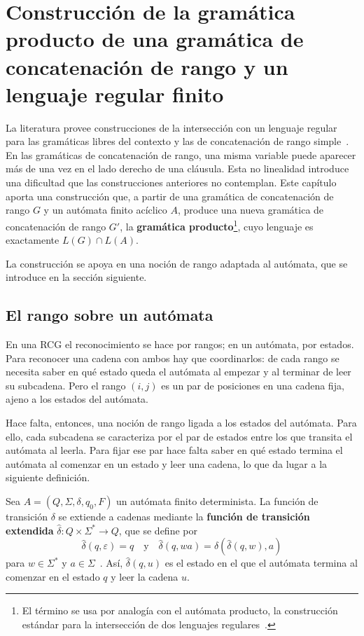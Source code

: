 
\chapter{Construcción de la gramática producto de una gramática de concatenación de rango y un lenguaje regular finito}
\label{cap:interseccion}

La literatura provee construcciones de la intersección con un lenguaje
regular para las gramáticas libres del contexto y las de
concatenación de rango simple~\cite{barhillel1961, bertsch2001rcg}. En las gramáticas
de concatenación de rango, una misma variable puede aparecer más de una
vez en el lado derecho de una cláusula. Esta no linealidad introduce una
dificultad que las construcciones anteriores no contemplan. Este capítulo aporta una
construcción que, a partir de una gramática de concatenación de rango
$G$ y un autómata finito acíclico $A$, produce una nueva gramática de
concatenación de rango $G'$, la \textbf{gramática
producto}\footnote{El término se usa por analogía con el autómata
producto, la construcción estándar para la intersección de dos
lenguajes regulares~\cite{hopcroft2006introduction}.},
cuyo lenguaje es exactamente $L(G) \cap L(A)$.

La construcción se apoya en una noción de rango adaptada al autómata,
que se introduce en la sección siguiente.

\section{El rango sobre un autómata}

En una RCG el reconocimiento se hace por rangos; en un autómata, por
estados. Para reconocer una cadena con ambos hay que coordinarlos: de
cada rango se necesita saber en qué estado queda el autómata al empezar
y al terminar de leer su subcadena. Pero el rango $(i, j)$ es un par de
posiciones en una cadena fija, ajeno a los estados del autómata.

Hace falta, entonces, una noción de rango ligada a los estados del
autómata. Para ello, cada subcadena se caracteriza por el par de estados
entre los que transita el autómata al leerla. Para fijar ese par hace
falta saber en qué estado termina el autómata al comenzar en un estado y
leer una cadena, lo que da lugar a la siguiente definición.

\begin{definicion}
Sea $A = (Q, \Sigma, \delta, q_0, F)$ un autómata finito determinista. La
función de transición $\delta$ se extiende a cadenas mediante la
\textbf{función de transición extendida}
$\hat\delta : Q \times \Sigma^* \to Q$, que se define por
\[
  \hat\delta(q, \varepsilon) = q \quad\text{y}\quad
  \hat\delta(q, wa) = \delta(\hat\delta(q, w), a)
\]
para $w \in \Sigma^*$ y $a \in \Sigma$~\cite{hopcroft2006introduction}.
Así, $\hat\delta(q, u)$ es el estado en el que el autómata termina al
comenzar en el estado $q$ y leer la cadena $u$.
\end{definicion}

